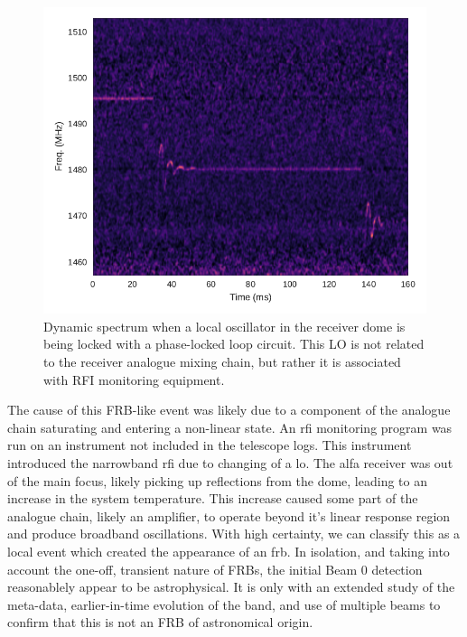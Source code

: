 \documentclass[a4paper,fleqn,usenatbib]{mnras}
\begin{document}
\begin{figure}
    \includegraphics[width=1.0\linewidth]{figures/pll_spectrum.pdf}
    \caption{Dynamic spectrum when a local oscillator in the receiver dome is
    being locked with a phase-locked loop circuit. This LO is not related to
    the receiver analogue mixing chain, but rather it is associated with RFI
    monitoring equipment.
    }
    \label{fig:pll_spectrum}
\end{figure}

The cause of this FRB-like event was likely due to a component of the analogue
chain saturating and entering a non-linear state.  An \gls{rfi} monitoring
program was run on an instrument not included in the telescope logs. This
instrument introduced the narrowband \gls{rfi} due to changing of a \gls{lo}.
The \gls{alfa} receiver was out of the main focus, likely picking up reflections
from the dome, leading to an increase in the system temperature.  This increase
caused some part of the analogue chain, likely an amplifier, to operate beyond
it's linear response region and produce broadband oscillations. With high
certainty, we can classify this as a local event which created the appearance of
an \gls{frb}.  In isolation, and taking into account the one-off, transient
nature of FRBs, the initial Beam 0 detection reasonablely appear to be
astrophysical. It is only with an extended study of the meta-data,
earlier-in-time evolution of the band, and use of multiple beams to confirm that
this is not an FRB of astronomical origin.
\end{document}
